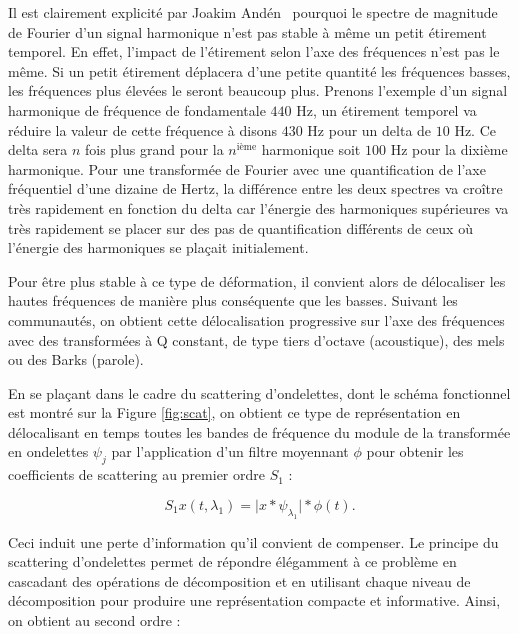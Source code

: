 Il est clairement explicité par Joakim And\'en~\cite{anden2014deep} pourquoi le spectre de magnitude de Fourier d'un signal harmonique n'est pas stable à même un petit étirement temporel. En effet, l'impact de l'étirement selon l'axe des fréquences n'est pas le même. Si un petit étirement déplacera d'une petite quantité les fréquences basses, les fréquences plus élevées le seront beaucoup plus. Prenons l'exemple d'un signal harmonique de fréquence de fondamentale $440$ Hz, un étirement temporel va réduire la valeur de cette fréquence à disons $430$ Hz pour un delta de $10$ Hz. Ce delta sera $n$ fois plus grand pour la $n^{\text{ième}}$ harmonique soit $100$ Hz pour la dixième harmonique. Pour une transformée de Fourier avec une quantification de l'axe fréquentiel d'une dizaine de Hertz, la différence entre les deux spectres va croître très rapidement en fonction du delta car l'énergie des harmoniques supérieures va très rapidement se placer sur des pas de quantification différents de ceux où l'énergie des harmoniques se plaçait initialement.

Pour être plus stable à ce type de déformation, il convient alors de \og délocaliser \fg les hautes fréquences de manière plus conséquente que les basses. Suivant les communautés, on obtient cette délocalisation progressive sur l'axe des fréquences avec des transformées à Q constant, de type tiers d'octave (acoustique), des mels ou des Barks (parole).

En se plaçant dans le cadre du scattering d'ondelettes, dont le schéma fonctionnel est montré sur la Figure \ref{fig:scat}, on obtient ce type de représentation en délocalisant en temps toutes les bandes de fréquence du module de la transformée en ondelettes $\psi_j$ par l'application d'un filtre moyennant $\phi$ pour obtenir les coefficients de scattering au premier ordre $S_1$ :

\begin{equation}
S_1{x}(t, \lambda_1)
= \vert {x} \ast {\psi_{\lambda_1}} \vert \ast \phi(t)\mbox{.}
\end{equation}

Ceci induit une perte d'information qu'il convient de compenser. Le principe du scattering d'ondelettes permet de répondre élégamment à ce problème en cascadant des opérations de décomposition et en utilisant chaque niveau de décomposition pour produire une représentation compacte et informative. Ainsi, on obtient au second ordre :

